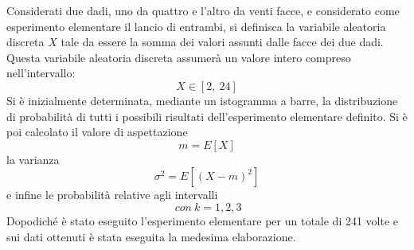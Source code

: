 Considerati due dadi, uno da quattro e l'altro da venti facce, e considerato come esperimento elementare il lancio di entrambi, si definisca la variabile aleatoria discreta $X$ tale da essere la somma dei valori assunti dalle facce dei due dadi. Questa variabile aleatoria discreta assumerà un valore intero compreso nell'intervallo:
\begin{equation}
	X\in[2,\ 24]
\end{equation}
Si è inizialmente determinata, mediante un istogramma a barre, la distribuzione di probabilità di tutti i possibili risultati dell'esperimento elementare definito. Si è poi calcolato il valore di aspettazione
\begin{equation}
	m=E[X]
\end{equation}
la varianza
\begin{equation}
	\sigma ^2=E[(X-m)^2]
\end{equation}
e infine le probabilità relative agli intervalli
\begin{equation}
	[m-k\sigma, m+k\sigma]\ con\ k=1,2,3
\end{equation} 
Dopodiché è stato eseguito l'esperimento elementare per un totale di 241 volte e sui dati ottenuti è stata eseguita la medesima elaborazione.